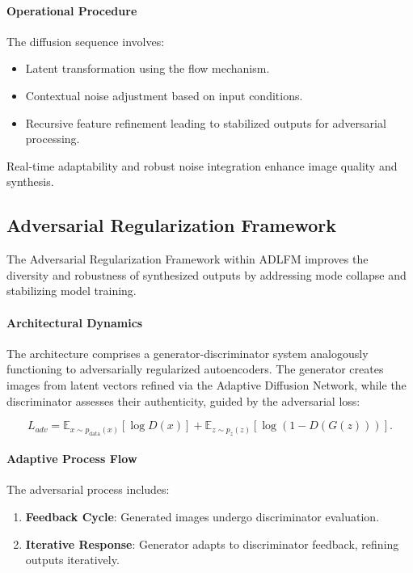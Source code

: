 \documentclass{article} %
\begin{document}
\paragraph{Operational Procedure}

The diffusion sequence involves:
\begin{itemize}
    \item Latent transformation using the flow mechanism.
    \item Contextual noise adjustment based on input conditions.
    \item Recursive feature refinement leading to stabilized outputs for adversarial processing.
\end{itemize}

Real-time adaptability and robust noise integration enhance image quality and synthesis.

\subsection{Adversarial Regularization Framework}

The Adversarial Regularization Framework within ADLFM improves the diversity and robustness of synthesized outputs by addressing mode collapse and stabilizing model training.

\paragraph{Architectural Dynamics}

The architecture comprises a generator-discriminator system analogously functioning to adversarially regularized autoencoders. The generator creates images from latent vectors refined via the Adaptive Diffusion Network, while the discriminator assesses their authenticity, guided by the adversarial loss:

\begin{equation}
L_{adv} = \mathbb{E}_{x \sim p_{\text{data}}(x)} [\log D(x)] + \mathbb{E}_{z \sim p_{z}(z)} [\log(1 - D(G(z)))].
\end{equation}

\paragraph{Adaptive Process Flow}

The adversarial process includes:
\begin{enumerate}
    \item \textbf{Feedback Cycle}: Generated images undergo discriminator evaluation.
    \item \textbf{Iterative Response}: Generator adapts to discriminator feedback, refining outputs iteratively.
\end{enumerate}
\end{document}
